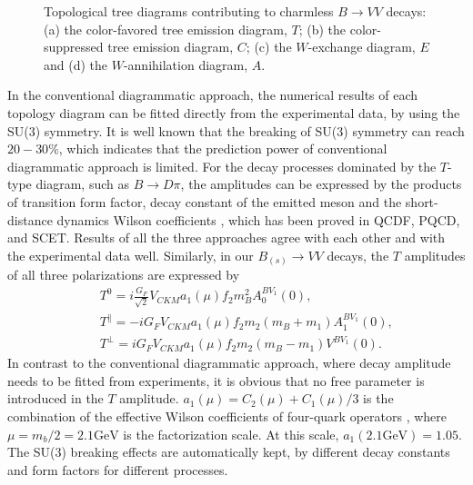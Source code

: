 \documentclass[11pt]{article}
\begin{document}
\begin{figure}%
  \begin{center}
  \caption{Topological tree diagrams contributing to
     charmless $B\to VV$ decays:
  (a) the color-favored   tree emission diagram, $T$;
  (b) the color-suppressed  tree emission diagram, $C$;
  (c) the $W$-exchange     diagram, $E$ and
  (d) the $W$-annihilation     diagram, $A$.}
  \label{Treediagram}
  \end{center}
  \end{figure}

 In the conventional diagrammatic approach, the numerical results of each topology diagram can be fitted directly from the experimental data, by using the SU(3) symmetry. It is well known  that the breaking of SU(3) symmetry can reach $20-30\%$, which indicates that the prediction power of conventional diagrammatic approach is limited.
  For the decay processes dominated by the $T$-type diagram, such as $B \to D\pi$, the amplitudes can be expressed by the products of transition form factor, decay constant of the emitted meson and the short-distance dynamics Wilson coefficients \cite{Zhou:2015jba}, which has been proved in QCDF, PQCD, and SCET.  Results of all the three approaches agree with each other and with the experimental data well. Similarly, in our $B_{(s)} \to VV$ decays, the $T$ amplitudes of all three polarizations are expressed by
\begin{eqnarray}\label{Tree}
&&{T}^0=i\frac{G_F}{\sqrt 2}V_{CKM}a_1(\mu)f_2m_B^2A_0^{BV_1}(0),\\
&&{T}^\parallel=-iG_FV_{CKM}a_1(\mu)f_2m_2 \left(m_B+m_1\right) A_1^{BV_1}(0),  \\
&&{T}^\perp=iG_FV_{CKM}a_1(\mu)f_2m_2\left(m_B-m_1\right)V^{BV_1}(0).
\end{eqnarray}
In contrast to the conventional diagrammatic approach, where decay amplitude needs to be fitted from experiments, it is obvious that no free parameter is introduced in the $T$ amplitude.  $a_1(\mu)=C_2(\mu)+C_1(\mu)/3$ is the combination of the effective Wilson coefficients of four-quark operators \cite{Buchalla:1996vs},
  where $\mu=m_b /2=2.1 \mathrm{GeV}$ is the factorization scale. At this scale, $a_1(2.1 \mathrm{GeV})=1.05$.
    The SU(3) breaking effects are automatically kept, by different   decay constants and  form factors for different processes.
\end{document}
